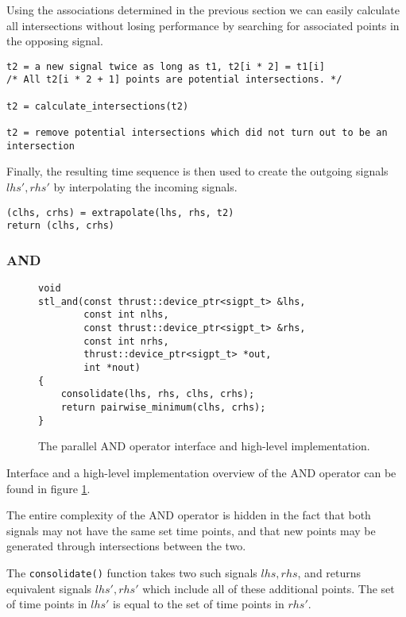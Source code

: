 \documentclass[a4paper,10pt]{article}
\begin{document}
Using the associations determined in the previous section we can easily calculate
all intersections without losing performance by searching for associated points
in the opposing signal.

\begin{lstlisting}
t2 = a new signal twice as long as t1, t2[i * 2] = t1[i]
/* All t2[i * 2 + 1] points are potential intersections. */

t2 = calculate_intersections(t2)

t2 = remove potential intersections which did not turn out to be an intersection
\end{lstlisting}

Finally, the resulting time sequence is then used to create the outgoing signals
$lhs', rhs'$ by interpolating the incoming signals.

\begin{lstlisting}
(clhs, crhs) = extrapolate(lhs, rhs, t2)
return (clhs, crhs)
\end{lstlisting}

\subsubsection{AND}

\begin{figure}[H]
\begin{lstlisting}
void
stl_and(const thrust::device_ptr<sigpt_t> &lhs,
        const int nlhs,
        const thrust::device_ptr<sigpt_t> &rhs,
        const int nrhs,
        thrust::device_ptr<sigpt_t> *out,
        int *nout)
{
	consolidate(lhs, rhs, clhs, crhs);
	return pairwise_minimum(clhs, crhs);
}
\end{lstlisting}
\caption{
\label{fig:parallel_and}
The parallel AND operator interface and high-level implementation.}
\end{figure}

Interface and a high-level implementation overview of the AND operator can be found 
in figure \ref{fig:parallel_and}.

The entire complexity of the AND operator is hidden in the fact that
both signals may not have the same set time points, and that new points
may be generated through intersections between the two.

The \lstinline|consolidate()|
function takes two such signals $lhs, rhs$, and returns equivalent signals $lhs', rhs'$ which include
all of these additional points. The set of time points in $lhs'$ is equal to the set
of time points in $rhs'$.
\end{document}
